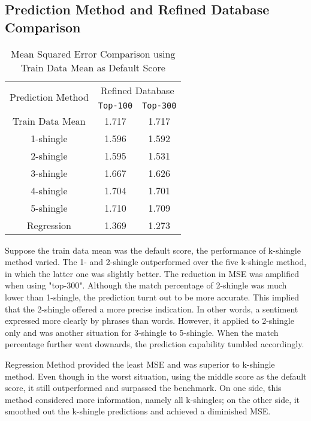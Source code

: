 \subsection{Prediction Method and Refined Database Comparison}

\begin{table}[H]
\caption{Mean Squared Error Comparison using Train Data Mean as Default Score}
	\begin{tabular}{ccc}
			\toprule
				\multirow{2}{*}{Prediction Method} &
				\multicolumn{2}{c}{Refined Database}\\
				\cline{2-3}
				& \texttt{Top-100} &  \texttt{Top-300} \\
			\midrule
				Train Data Mean & 1.717 & 1.717 \\
				\hline
				1-shingle & 1.596 & 1.592\\
				2-shingle & 1.595 & 1.531\\
				3-shingle & 1.667 & 1.626\\
				4-shingle & 1.704 & 1.701\\
				5-shingle & 1.710 & 1.709\\
				\hline
				Regression & 1.369 & 1.273\\

			\bottomrule
		\end{tabular}

\end{table}

Suppose the train data mean was the default score, the performance of k-shingle method varied. The 1- and 2-shingle outperformed over the five k-shingle method, in which the latter one was slightly better. The reduction in MSE was amplified when using "top-300". Although the match percentage of 2-shingle was much lower than 1-shingle, the prediction turnt out to be more accurate. This implied that the 2-shingle offered a more precise indication. In other words, a sentiment expressed more clearly by phrases than words.
However, it applied to 2-shingle only and was another situation for 3-shingle to 5-shingle. When the match percentage further went downards, the prediction capability tumbled accordingly. 

Regression Method provided the least MSE and was superior to k-shingle method. Even though in the worst situation, using the middle score as the default score, it still outperformed and surpassed the benchmark. On one side, this method considered more information, namely all k-shingles; on the other side, it smoothed out the k-shingle predictions and achieved a diminished MSE.

